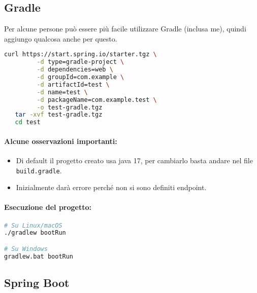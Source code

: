 \subsection{Gradle}

Per alcune persone può essere più facile utilizzare Gradle (inclusa me), quindi aggiungo qualcosa anche per questo. 



\begin{lstlisting}[language=bash, caption={Creazione di un progetto Spring Boot con Gradle}]
curl https://start.spring.io/starter.tgz \
         -d type=gradle-project \
         -d dependencies=web \
         -d groupId=com.example \
         -d artifactId=test \
         -d name=test \
         -d packageName=com.example.test \
         -o test-gradle.tgz
   tar -xvf test-gradle.tgz
   cd test
\end{lstlisting}

\paragraph{Alcune osservazioni importanti:}

\begin{itemize}
\item Di default il progetto creato usa java 17, per cambiarlo basta andare nel file \texttt{build.gradle}.
\item Inizialmente darà errore perché non si sono definiti endpoint.
\end{itemize}

\paragraph{Esecuzione del progetto:}

\begin{lstlisting}[language=bash, caption={Avvio del progetto Spring Boot con Gradle}]
# Su Linux/macOS
./gradlew bootRun

# Su Windows
gradlew.bat bootRun
\end{lstlisting}


\subsection{Spring Boot}








